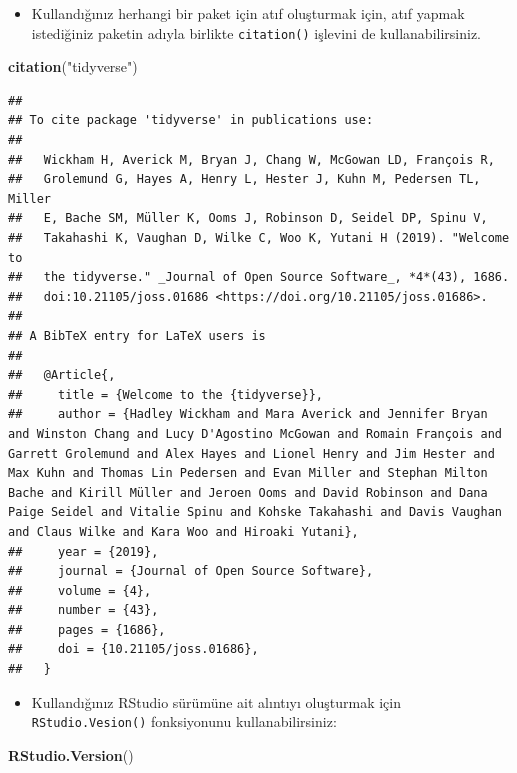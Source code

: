 \documentclass[
  oneside]{book}
\newenvironment{Shaded}{\begin{snugshade}}{\end{snugshade}}
\newcommand{\FunctionTok}[1]{\textcolor[rgb]{0.13,0.29,0.53}{\textbf{#1}}}
\newcommand{\NormalTok}[1]{#1}
\newcommand{\StringTok}[1]{\textcolor[rgb]{0.31,0.60,0.02}{#1}}
\providecommand{\tightlist}{%
  \setlength{\itemsep}{0pt}\setlength{\parskip}{0pt}}
\begin{document}
\begin{itemize}
\tightlist
\item
  Kullandığınız herhangi bir paket için atıf oluşturmak için, atıf yapmak istediğiniz paketin adıyla birlikte \texttt{citation()} işlevini de kullanabilirsiniz.
\end{itemize}

\begin{Shaded}
\begin{Highlighting}[]
\FunctionTok{citation}\NormalTok{(}\StringTok{"tidyverse"}\NormalTok{)}
\end{Highlighting}
\end{Shaded}

\begin{verbatim}
## 
## To cite package 'tidyverse' in publications use:
## 
##   Wickham H, Averick M, Bryan J, Chang W, McGowan LD, François R,
##   Grolemund G, Hayes A, Henry L, Hester J, Kuhn M, Pedersen TL, Miller
##   E, Bache SM, Müller K, Ooms J, Robinson D, Seidel DP, Spinu V,
##   Takahashi K, Vaughan D, Wilke C, Woo K, Yutani H (2019). "Welcome to
##   the tidyverse." _Journal of Open Source Software_, *4*(43), 1686.
##   doi:10.21105/joss.01686 <https://doi.org/10.21105/joss.01686>.
## 
## A BibTeX entry for LaTeX users is
## 
##   @Article{,
##     title = {Welcome to the {tidyverse}},
##     author = {Hadley Wickham and Mara Averick and Jennifer Bryan and Winston Chang and Lucy D'Agostino McGowan and Romain François and Garrett Grolemund and Alex Hayes and Lionel Henry and Jim Hester and Max Kuhn and Thomas Lin Pedersen and Evan Miller and Stephan Milton Bache and Kirill Müller and Jeroen Ooms and David Robinson and Dana Paige Seidel and Vitalie Spinu and Kohske Takahashi and Davis Vaughan and Claus Wilke and Kara Woo and Hiroaki Yutani},
##     year = {2019},
##     journal = {Journal of Open Source Software},
##     volume = {4},
##     number = {43},
##     pages = {1686},
##     doi = {10.21105/joss.01686},
##   }
\end{verbatim}

\begin{itemize}
\tightlist
\item
  Kullandığınız RStudio sürümüne ait alıntıyı oluşturmak için \texttt{RStudio.Vesion()} fonksiyonunu kullanabilirsiniz:
\end{itemize}

\begin{Shaded}
\begin{Highlighting}[]
\FunctionTok{RStudio.Version}\NormalTok{()}
\end{Highlighting}
\end{Shaded}
\end{document}
